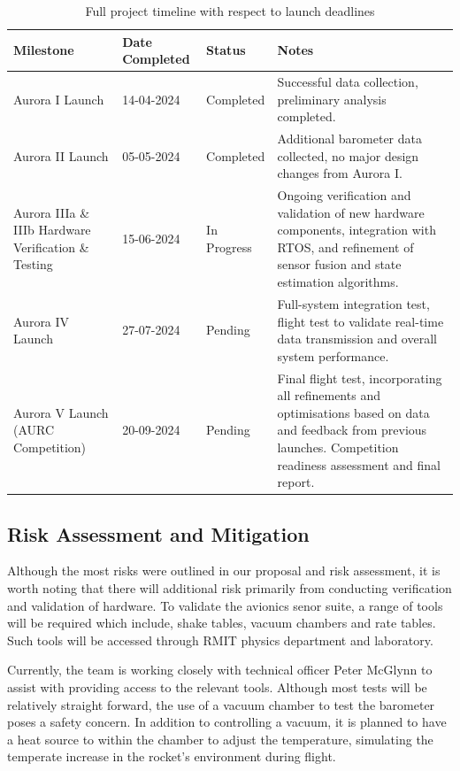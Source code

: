 \setlength\extrarowheight{1em}
\begin{table}[h]
\centering
\begin{tabularx}{\textwidth}{XllX}
\toprule
\textbf{Milestone} & \textbf{Date Completed} & \textbf{Status} & \textbf{Notes} \\
\midrule
Aurora I Launch & 14-04-2024 & Completed & Successful data collection, preliminary analysis completed. \\
Aurora II Launch & 05-05-2024 & Completed & Additional barometer data collected, no major design changes from Aurora I. \\
Aurora IIIa \& IIIb Hardware Verification \& Testing & 15-06-2024 & In Progress & Ongoing verification and validation of new hardware components, integration with RTOS, and refinement of sensor fusion and state estimation algorithms. \\
Aurora IV Launch & 27-07-2024 & Pending & Full-system integration test, flight test to validate real-time data transmission and overall system performance. \\
Aurora V Launch (AURC Competition) & 20-09-2024 & Pending & Final flight test, incorporating all refinements and optimisations based on data and feedback from previous launches. Competition readiness assessment and final report. \\
\bottomrule
\end{tabularx}
\caption{Full project timeline with respect to launch deadlines}\label{tbl:timeline}
\end{table}

\subsection{Risk Assessment and Mitigation}
Although the most risks were outlined in our proposal and risk assessment, it is worth noting that there will additional risk primarily from conducting verification and validation of hardware. To validate the avionics senor suite, a range of tools will be required which include, shake tables, vacuum chambers and rate tables. Such tools will be accessed through RMIT physics department and laboratory. 

Currently, the team is working closely with technical officer Peter McGlynn to assist with providing access to the relevant tools. Although most tests will be relatively straight forward, the use of a vacuum chamber to test the barometer poses a safety concern. In addition to controlling a vacuum, it is planned to have a heat source to within the chamber to adjust the temperature, simulating the temperate increase in the rocket’s environment during flight. 

